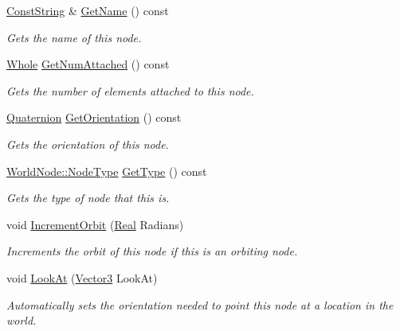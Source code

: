 \begin{DoxyCompactItemize}
\hyperlink{namespacephys_a5ce5049f8b4bf88d6413c47b504ebb31}{ConstString} \& \hyperlink{classphys_1_1WorldNode_ae3c12e7aced8f84e2191a5e08e2767a8}{GetName} () const 
\begin{DoxyCompactList}\small\item\em Gets the name of this node. \item\end{DoxyCompactList}\item 
\hyperlink{namespacephys_a460f6bc24c8dd347b05e0366ae34f34a}{Whole} \hyperlink{classphys_1_1WorldNode_a409eca3c9a924f1485e1c25c7d60e43d}{GetNumAttached} () const 
\begin{DoxyCompactList}\small\item\em Gets the number of elements attached to this node. \item\end{DoxyCompactList}\item 
\hyperlink{classphys_1_1Quaternion}{Quaternion} \hyperlink{classphys_1_1WorldNode_a90b439d8af095c040b2d9e4576a113d1}{GetOrientation} () const 
\begin{DoxyCompactList}\small\item\em Gets the orientation of this node. \item\end{DoxyCompactList}\item 
\hyperlink{classphys_1_1WorldNode_a0b178b06aa411b00c4c2ccd926d9bf5a}{WorldNode::NodeType} \hyperlink{classphys_1_1WorldNode_a438a26ff58e93e611deea737a95ae654}{GetType} () const 
\begin{DoxyCompactList}\small\item\em Gets the type of node that this is. \item\end{DoxyCompactList}\item 
void \hyperlink{classphys_1_1WorldNode_a0849395a47c9cd3182a6a3717b95bcbc}{IncrementOrbit} (\hyperlink{namespacephys_af7eb897198d265b8e868f45240230d5f}{Real} Radians)
\begin{DoxyCompactList}\small\item\em Increments the orbit of this node if this is an orbiting node. \item\end{DoxyCompactList}\item 
void \hyperlink{classphys_1_1WorldNode_aa0373976b11af2171188d2ee8c114420}{LookAt} (\hyperlink{classphys_1_1Vector3}{Vector3} LookAt)
\begin{DoxyCompactList}\small\item\em Automatically sets the orientation needed to point this node at a location in the world. \item\end{DoxyCompactList}\item 

\end{DoxyCompactItemize}
